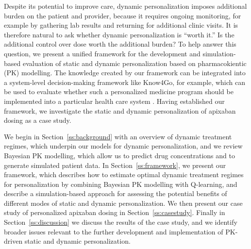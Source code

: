 Despite its potential to improve care, dynamic personalization imposes additional burden on the patient and provider, because it requires ongoing monitoring, for example by gathering lab results and returning for additional clinic visits. It is therefore natural to ask whether dynamic personalization is ``worth it.'' Is the additional control over dose worth the additional burden? To help answer this question, we present a unified framework for the development and simulation-based evaluation of static and dynamic personalization based on pharmacokientic (PK) modelling. The knowledge created by our framework can be integrated into a system-level decision-making framework like Know4Go, for example, which can be used to evaluate whether such a personalized medicine program should be implemented into a particular health care system \cite{Martin2016}. Having established our framework, we investigate the static and dynamic personalization of apixaban dosing as a case study.

We begin in Section~\ref{ss:background} with an overview of dynamic treatment regimes, which underpin our models for dynamic personalization, and we review Bayesian PK modelling, which allow us to predict drug concentrations and to generate simulated patient data. In Section~\ref{ss:framework}, we present our framework, which describes how to estimate  optimal dynamic treatment regimes for personalization by combining Bayesian PK modelling with Q-learning, and describe a simulation-based approach for assessing the potential benefits of different modes of static and dynamic personalization.  We then present our case study of personalized apixaban dosing in Section~\ref{ss:casestudy}. Finally in Section~\ref{ss:discussion} we discuss the results of the case study, and we identify broader issues relevant to the further development and implementation of PK-driven static and dynamic personalization.